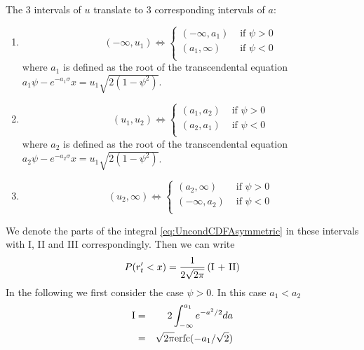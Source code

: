 \documentclass{book}
\begin{document}
The 3 intervals of $u$ translate to 3 corresponding intervals of $a$:
\begin{enumerate}[I]
\item
  \begin{equation*}
    (-\infty, u_1) \Leftrightarrow \left\{
    \begin{array}{ll}
      (-\infty, a_1) & \text{ if } \psi > 0 \\
      (a_1, \infty) & \text{ if } \psi < 0 \\
    \end{array}
    \right.
  \end{equation*}
  where $a_1$ is defined as the root of the
  transcendental equation $a_1\psi - e^{-a_1\sigma}x = u_1 \sqrt{2(1-\psi^2)}$.
\item
  \begin{equation}\label{eq:RegionI}
    (u_1, u_2) \Leftrightarrow \left\{
    \begin{array}{ll}
      (a_1, a_2) & \text{ if } \psi > 0 \\
      (a_2, a_1) & \text{ if } \psi < 0 \\
    \end{array}
    \right.
  \end{equation}
  where $a_2$ is defined as the root of the
  transcendental equation $a_2\psi - e^{-a_2\sigma}x = u_1 \sqrt{2(1-\psi^2)}$.
\item
  \begin{equation}\label{eq:RegionII}
    (u_2, \infty) \Leftrightarrow \left\{
    \begin{array}{ll}
      (a_2, \infty) & \text{ if } \psi > 0 \\
      (-\infty, a_2) & \text{ if } \psi < 0 \\
    \end{array}
    \right.
  \end{equation}
\end{enumerate}
We denote the parts of the integral \ref{eq:UncondCDFAsymmetric} in
these intervals with I, II and III correspondingly. Then we can write
\begin{equation}\label{eq:DeducedCDF}
    P(r'_t < x) = {1 \over 2\sqrt{2\pi}} \left(
      \text{I + II}
    \right)
\end{equation}
In the following we first consider the case $\psi > 0$. In this case
$a_1 < a_2$
\begin{eqnarray*}
  \text{I} &=& 2 \int_{-\infty}^{a_1} e^{-a^2/2} da \\
  &=& \sqrt{2\pi} \text{erfc}(-a_1/\sqrt 2)
\end{eqnarray*}
\end{document}
